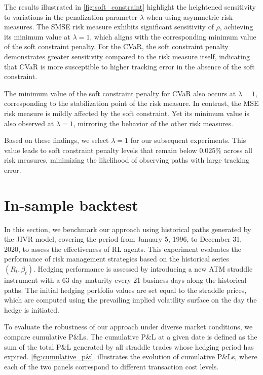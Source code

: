 \documentclass[12pt]{article}
\begin{document}
The results illustrated in \autoref{fig:soft_constraint} highlight the heightened sensitivity to variations in the penalization parameter $\lambda$ when using asymmetric risk measures. The SMSE risk measure exhibits significant sensitivity of $\rho$, achieving its minimum value at $\lambda = 1$, which aligns with the corresponding minimum value of the soft constraint penalty. For the CVaR, the soft constraint penalty demonstrates greater sensitivity compared to the risk measure itself, indicating that CVaR is more susceptible to higher tracking error in the absence of the soft constraint.

The minimum value of the soft constraint penalty for CVaR also occurs at $\lambda = 1$, corresponding to the stabilization point of the risk measure. In contrast, the MSE risk measure is mildly affected by the soft constraint. Yet its minimum value is also observed at $\lambda = 1$, mirroring the behavior of the other risk measures.

Based on these findings, we select $\lambda = 1$ for our subsequent experiments. This value leads to soft constraint penalty levels that remain below $0.025\%$ across all risk measures, minimizing the likelihood of observing paths with large tracking error.


\section{In-sample backtest}

In this section, we benchmark our approach using historical paths generated by the JIVR model, covering the period from January 5, 1996, to December 31, 2020, to assess the effectiveness of RL agents. This experiment evaluates the performance of risk management strategies based on the historical series $(R_{t}, \beta_{t})$.  
Hedging performance is assessed by introducing a new ATM straddle instrument with a 63-day maturity every 21 business days along the historical paths. The initial hedging portfolio values are set equal to the straddle prices, which are computed using the prevailing implied volatility surface on the day the hedge is initiated.

To evaluate the robustness of our approach under diverse market conditions, we compare cumulative P\&Ls. The cumulative P\&L at a given date is defined as the sum of the total P\&L generated by all straddle trades whose hedging period has expired.
\autoref{fig:cumulative_p&l} illustrates the evolution of cumulative P\&Ls, where each of the two panels correspond to different transaction cost levels.
\end{document}
